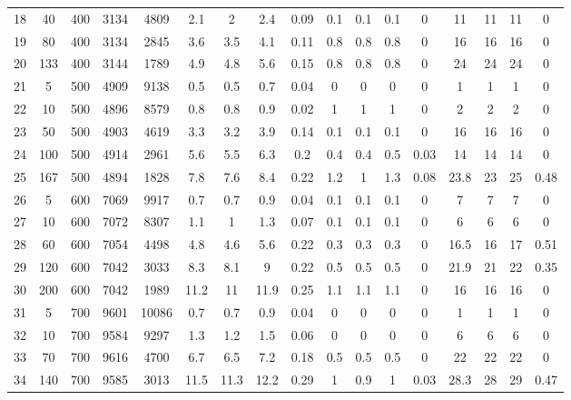 \documentclass[11pt]{article}
\newcommand{\np}{\newpage}
\begin{document}
\begin{appendices}
\begin{landscape}
\begin{longtable}[c]{ccccc|cccc|cccc|cccc}
				18 & 40 & 400 & 3134 & 4809 & 2.1 & 2 & 2.4 & 0.09 & 0.1 & 0.1 & 0.1 & 0 & 11 & 11 & 11 & 0 \\
				19 & 80 & 400 & 3134 & 2845 & 3.6 & 3.5 & 4.1 & 0.11 & 0.8 & 0.8 & 0.8 & 0 & 16 & 16 & 16 & 0 \\
				20 & 133 & 400 & 3144 & 1789 & 4.9 & 4.8 & 5.6 & 0.15 & 0.8 & 0.8 & 0.8 & 0 & 24 & 24 & 24 & 0 \\ \np
				\rowcolor[HTML]{EFEFEF} 
				21 & 5 & 500 & 4909 & 9138 & 0.5 & 0.5 & 0.7 & 0.04 & \cellcolor[HTML]{EFEFEF}0 & 0 & 0 & 0 &1 & 1 & 1 & 0 \\
				\rowcolor[HTML]{EFEFEF} 
				22 & 10 & 500 & 4896 & 8579 & 0.8 & 0.8 & 0.9 & 0.02 & 1 & 1 & 1 & 0 & 2 & 2 & 2 & 0 \\
				\rowcolor[HTML]{EFEFEF} 
				23 & 50 & 500 & 4903 & 4619 & 3.3 & 3.2 & 3.9 & 0.14 & 0.1 & 0.1 & 0.1 & 0 & 16 & 16 & 16 & 0 \\
				\rowcolor[HTML]{EFEFEF} 
				24 & 100 & 500 & 4914 & 2961 & 5.6 & 5.5 & 6.3 & 0.2 & 0.4 & 0.4 & 0.5 & 0.03 & 14 & 14 & 14 & 0 \\
				\rowcolor[HTML]{EFEFEF} 
				25 & 167 & 500 & 4894 & 1828 & 7.8 & 7.6 & 8.4 & 0.22 & 1.2 & 1 & 1.3 & 0.08 & 23.8 & 23 & 25 & 0.48 \\
				26 & 5 & 600 & 7069 & 9917 & 0.7 & 0.7 & 0.9 & 0.04 & 0.1 & 0.1 & 0.1 & 0 & 7 & 7 & 7 & 0 \\
				27 & 10 & 600 & 7072 & 8307 & 1.1 & 1 & 1.3 & 0.07 & 0.1 & 0.1 & 0.1 & 0 & 6 & 6 & 6 & 0 \\
				28 & 60 & 600 & 7054 & 4498 & 4.8 & 4.6 & 5.6 & 0.22 & 0.3 & 0.3 & 0.3 & 0 & 16.5 & 16 & 17 & 0.51 \\
				29 & 120 & 600 & 7042 & 3033 & 8.3 & 8.1 & 9 & 0.22 & 0.5 & 0.5 & 0.5 & 0 & 21.9 & 21 & 22 & 0.35 \\
				30 & 200 & 600 & 7042 & 1989 & 11.2 & 11 & 11.9 & 0.25 & 1.1 & 1.1 & 1.1 & 0 & 16 & 16 & 16 & 0 \\
				\rowcolor[HTML]{EFEFEF} 
				31 & 5 & 700 & 9601 & 10086 & 0.7 & 0.7 & 0.9 & 0.04 & 0 & 0 & 0 & 0 & 1 & 1 & 1 & 0 \\
				\rowcolor[HTML]{EFEFEF} 
				32 & 10 & 700 & 9584 & 9297 & 1.3 & 1.2 & 1.5 & 0.06 & 0 & 0 & 0 & 0 & 6 & 6 & 6 & 0 \\
				\rowcolor[HTML]{EFEFEF} 
				33 & 70 & 700 & 9616 & 4700 & 6.7 & 6.5 & 7.2 & 0.18 & 0.5 & 0.5 & 0.5 & 0 & 22 & 22 & 22 & 0 \\
				\rowcolor[HTML]{EFEFEF} 
				34 & 140 & 700 & 9585 & 3013 & 11.5 & 11.3 & 12.2 & 0.29 & 1 & 0.9 & 1 & 0.03 & 28.3 & 28 & 29 & 0.47 \\

\end{longtable}
\end{landscape}
\end{appendices}
\end{document}
